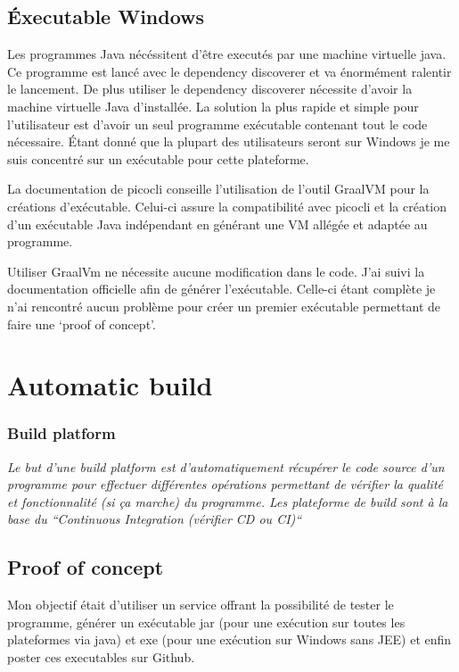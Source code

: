 \documentclass[french,a4paper,12pt]{report}
\begin{document}
\subsection{Éxecutable Windows}

Les programmes Java nécéssitent d’être executés par une machine virtuelle java. Ce programme est lancé avec le dependency discoverer et va énormément ralentir le lancement. De plus utiliser le dependency discoverer nécessite d’avoir la machine virtuelle Java d’installée. La solution la plus rapide et simple pour l’utilisateur est d’avoir un seul programme exécutable contenant tout le code nécessaire. Étant donné que la plupart des utilisateurs seront sur Windows je me suis concentré sur un exécutable pour cette plateforme.

La documentation de picocli conseille l’utilisation de l’outil GraalVM pour la créations d’exécutable. Celui-ci assure la compatibilité avec picocli et la création d’un exécutable Java indépendant en générant une VM allégée et adaptée au programme. 

Utiliser GraalVm ne nécessite aucune modification dans le code. J’ai suivi la documentation officielle afin de générer l’exécutable. Celle-ci étant complète je n’ai rencontré aucun problème pour créer un premier exécutable permettant de faire une ‘proof of concept’.


\section{Automatic build}

\subsubsection{Build platform}

\textit{Le but d’une build platform est d’automatiquement récupérer le code source d’un programme pour effectuer différentes opérations permettant de vérifier la qualité et fonctionnalité (si ça marche) du programme. Les plateforme de build sont à la base du “Continuous Integration (vérifier CD ou CI)“}

\subsection{Proof of concept}

Mon objectif était d'utiliser un service offrant la possibilité de tester le programme, générer un exécutable jar (pour une exécution sur toutes les plateformes via java) et exe (pour une exécution sur Windows sans JEE) et enfin poster ces executables sur Github. 
\end{document}
